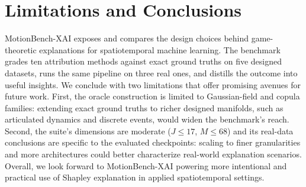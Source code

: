 \section{Limitations and Conclusions}
\label{sec:discussion}

MotionBench-XAI exposes and compares the design choices behind game-theoretic explanations for spatiotemporal machine learning. The benchmark grades ten attribution methods against exact ground truths on five designed datasets, runs the same pipeline on three real ones, and distills the outcome into useful insights. We conclude with two limitations that offer promising avenues for future work. First, the oracle construction is limited to Gaussian-field and copula families: extending exact ground truths to richer designed manifolds, such as articulated dynamics and discrete events, would widen the benchmark's reach. Second, the suite's dimensions are moderate ($J \leq 17$, $M \leq 68$) and its real-data conclusions are specific to the evaluated checkpoints: scaling to finer granularities and more architectures could better characterize real-world explanation scenarios. Overall, we look forward to MotionBench-XAI powering more intentional and practical use of Shapley explanation in applied spatiotemporal settings.


